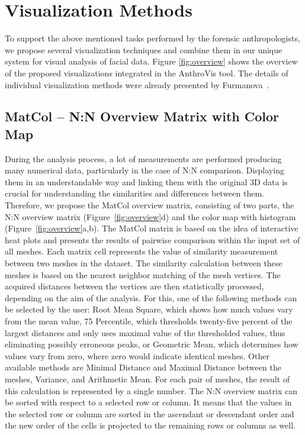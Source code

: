 \documentclass[final,5p,times]{elsarticle}
\begin{document}
\section{Visualization Methods} \label{exface}
To support the above mentioned tasks performed by the forensic anthropologists, we propose several visualization techniques and combine them in our unique system for visual analysis of facial data.
Figure \ref{fig:overview} shows the overview of the proposed visualizations integrated in the AnthroVis tool.
The details of individual visualization methods were already presented by Furmanova~\cite{Furmanova2015}.

\subsection{MatCol -- N:N Overview Matrix with Color Map}
During the analysis process, a lot of measurements are performed producing many numerical data, particularly in the case of N:N comparison.
Displaying them in an understandable way and linking them with the original 3D data is crucial for understanding the similarities and differences between them.
Therefore, we propose the MatCol overview matrix, consisting of two parts, the N:N overview matrix (Figure~\ref{fig:overview}d) and the color map with histogram (Figure~\ref{fig:overview}a,b). 
The MatCol matrix is based on the idea of interactive heat plots and presents the results of pairwise comparison within the input set of all meshes.
Each matrix cell represents the value of similarity measurement between two meshes in the dataset.
The similarity calculation between these meshes is based on the nearest neighbor matching of the mesh vertices.
The acquired distances between the vertices are then statistically processed, depending on the aim of the analysis.
For this, one of the following methods can be selected by the user: Root Mean Square, which shows how much values vary from the mean value, 75 Percentile, which thresholds twenty-five percent of the largest distances and only uses maximal value of the thresholded values, thus eliminating possibly erroneous peaks, or Geometric Mean, which determines how values vary from zero, where zero would indicate identical meshes. 
Other available methods are Minimal Distance and Maximal Distance between the meshes, Variance, and Arithmetic Mean.
For each pair of meshes, the result of this calculation is represented by a single number.
The N:N overview matrix can be sorted with respect to a selected row or column.
It means that the values in the selected row or column are sorted in the ascendant or descendant order and the new order of the cells is projected to the remaining rows or columns as well.
\end{document}
